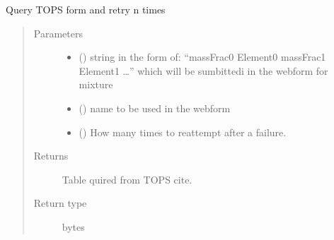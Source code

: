 \documentclass[letterpaper,10pt,english]{sphinxmanual}
\begin{document}
\begin{fulllineitems}
\label{\detokenize{pyTOPSScrape.api:pyTOPSScrape.api.api.TOPS_query}}
\sphinxAtStartPar
Query TOPS form and retry n times
\begin{quote}\begin{description}
\item[{Parameters}] \leavevmode\begin{itemize}
\item {} 
\sphinxAtStartPar
{} () \textendash{} string in the form of: “massFrac0 Element0 massFrac1 Element1 …”
which will be sumbittedi in the webform for mixture

\item {} 
\sphinxAtStartPar
{} () \textendash{} name to be used in the webform

\item {} 
\sphinxAtStartPar
{} () \textendash{} How many times to reattempt after a failure.

\end{itemize}

\item[{Returns}] \leavevmode
\sphinxAtStartPar
{} \textendash{} Table quired from TOPS cite.

\item[{Return type}] \leavevmode
\sphinxAtStartPar
bytes

\end{description}\end{quote}

\end{fulllineitems}

\end{document}
